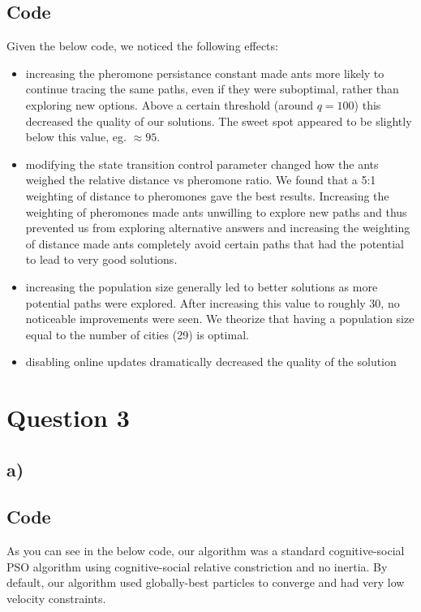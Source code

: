 \documentclass[12pt]{article}
\begin{document}
\subsection*{Code}
Given the below code, we noticed the following effects:
\begin{itemize}
\item increasing the pheromone persistance constant made ants more likely to continue tracing the same paths, even if they were suboptimal, rather than exploring new options. Above a certain threshold (around $q=100$) this decreased the quality of our solutions. The sweet spot appeared to be slightly below this value, eg. $\approx 95$.
\item modifying the state transition control parameter changed how the ants weighed the relative distance vs pheromone ratio. We found that a 5:1 weighting of distance to pheromones gave the best results. Increasing the weighting of pheromones made ants unwilling to explore new paths and thus prevented us from exploring alternative answers and increasing the weighting of distance made ants completely avoid certain paths that had the potential to lead to very good solutions.
\item increasing the population size generally led to better solutions as more potential paths were explored. After increasing this value to roughly 30, no noticeable improvements were seen. We theorize that having a population size equal to the number of cities (29) is optimal.
\item disabling online updates dramatically decreased the quality of the solution
\end{itemize}



\section*{Question 3}
\subsection*{a)}

\subsection*{Code}
As you can see in the below code, our algorithm was a standard cognitive-social PSO algorithm using cognitive-social relative constriction and no inertia. By default, our algorithm used globally-best particles to converge and had very low velocity constraints.
\end{document}
